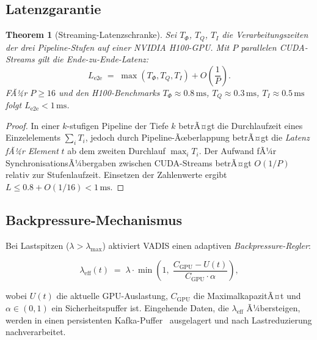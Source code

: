 ﻿\documentclass[12pt,a4paper]{article}
\newtheorem{theorem}{Theorem}[section]
\begin{document}
\subsection{Latenzgarantie}

\begin{theorem}[Streaming-Latenzschranke]
\label{thm:latency}
Sei $T_\Phi$, $T_Q$, $T_I$ die Verarbeitungszeiten der drei
Pipeline-Stufen auf einer NVIDIA H100-GPU. Mit $P$ parallelen
CUDA-Streams gilt die Ende-zu-Ende-Latenz:
\[
  L_{\text{e2e}} \;=\; \max(T_\Phi, T_Q, T_I) + O\!\left(\frac{1}{P}\right).
\]
FÃ¼r $P \geq 16$ und den H100-Benchmarks
$T_\Phi \approx 0.8\,\mathrm{ms}$, $T_Q \approx 0.3\,\mathrm{ms}$,
$T_I \approx 0.5\,\mathrm{ms}$ folgt $L_{\text{e2e}} < 1\,\mathrm{ms}$.
\end{theorem}

\begin{proof}
In einer $k$-stufigen Pipeline der Tiefe $k$ betrÃ¤gt die
Durchlaufzeit eines Einzelelements $\sum_i T_i$, jedoch durch
Pipeline-Ãœberlappung betrÃ¤gt die \emph{Latenz fÃ¼r Element}
$t$ ab dem zweiten Durchlauf $\max_i T_i$. Der Aufwand fÃ¼r
SynchronisationsÃ¼bergaben zwischen CUDA-Streams betrÃ¤gt
$O(1/P)$ relativ zur Stufenlaufzeit. Einsetzen der Zahlenwerte
ergibt $L \leq 0.8 + O(1/16) < 1\,\mathrm{ms}$.
\end{proof}

\subsection{Backpressure-Mechanismus}

Bei Lastspitzen ($\lambda > \lambda_{\max}$) aktiviert VADIS
einen adaptiven \emph{Backpressure-Regler}:

\begin{equation}
  \lambda_{\text{eff}}(t) \;=\; \lambda \cdot \min\!\left(1,\;
  \frac{C_{\text{GPU}} - U(t)}{C_{\text{GPU}} \cdot \alpha}\right),
\end{equation}

wobei $U(t)$ die aktuelle GPU-Auslastung, $C_{\text{GPU}}$ die
MaximalkapazitÃ¤t und $\alpha \in (0,1)$ ein Sicherheitspuffer ist.
Eingehende Daten, die $\lambda_{\text{eff}}$ Ã¼bersteigen, werden
in einen persistenten Kafka-Puffer~\cite{kreps2011kafka} ausgelagert
und nach Lastreduzierung nachverarbeitet.

\end{document}
